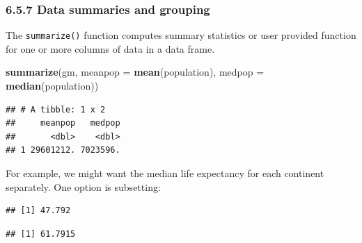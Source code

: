 \documentclass[]{article}
\newenvironment{Shaded}{\begin{snugshade}}{\end{snugshade}}
\newcommand{\KeywordTok}[1]{\textcolor[rgb]{0.13,0.29,0.53}{\textbf{#1}}}
\newcommand{\DataTypeTok}[1]{\textcolor[rgb]{0.13,0.29,0.53}{#1}}
\newcommand{\StringTok}[1]{\textcolor[rgb]{0.31,0.60,0.02}{#1}}
\newcommand{\OperatorTok}[1]{\textcolor[rgb]{0.81,0.36,0.00}{\textbf{#1}}}
\newcommand{\NormalTok}[1]{#1}
\begin{document}
\subsubsection{6.5.7 Data summaries and
grouping}\label{data-summaries-and-grouping}

The \texttt{summarize()} function computes summary statistics or user
provided function for one or more columns of data in a data frame.

\begin{Shaded}
\begin{Highlighting}[]
\KeywordTok{summarize}\NormalTok{(gm, }\DataTypeTok{meanpop =} \KeywordTok{mean}\NormalTok{(population), }\DataTypeTok{medpop =} \KeywordTok{median}\NormalTok{(population))}
\end{Highlighting}
\end{Shaded}

\begin{verbatim}
## # A tibble: 1 x 2
##     meanpop   medpop
##       <dbl>    <dbl>
## 1 29601212. 7023596.
\end{verbatim}

For example, we might want the median life expectancy for each continent
separately. One option is subsetting:

\begin{Shaded}
\end{Shaded}

\begin{verbatim}
## [1] 47.792
\end{verbatim}

\begin{Shaded}
\end{Shaded}

\begin{verbatim}
## [1] 61.7915
\end{verbatim}

\begin{Shaded}
\end{Shaded}
\end{document}
